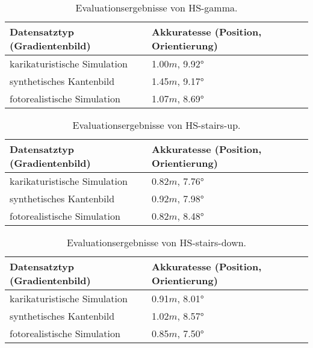 \begin{table}
	\centering
	\caption{Evaluationsergebnisse von HS-gamma.}
	\begin{tabularx}{0.75\textwidth}{X X}\textbf{Datensatztyp} \hspace{2cm} (Gradientenbild)& \textbf{Akkuratesse} \hspace{2cm} (Position, Orientierung)\\
		\hline
		karikaturistische Simulation & 1.00$m$, 9.92°\\
		\hline
		synthetisches Kantenbild & 1.45$m$, 9.17°\\
		\hline
		fotorealistische Simulation & 1.07$m$, 8.69°\\
	\end{tabularx}
	\label{tab:synth_hs_gamma}
\end{table}


\begin{table}
	\centering
	\caption{Evaluationsergebnisse von HS-stairs-up.}
	\begin{tabularx}{0.75\textwidth}{X X}\textbf{Datensatztyp} \hspace{2cm} (Gradientenbild)& \textbf{Akkuratesse} \hspace{2cm} (Position, Orientierung)\\
		\hline
		karikaturistische Simulation & 0.82$m$, 7.76°\\
		\hline
		synthetisches Kantenbild & 0.92$m$, 7.98°\\
		\hline
		fotorealistische Simulation & 0.82$m$, 8.48°\\
	\end{tabularx}
	\label{tab:synth_hs_stairs_up}
\end{table}



\begin{table}
	\centering
	\caption{Evaluationsergebnisse von HS-stairs-down.}
	\begin{tabularx}{0.75\textwidth}{X X}\textbf{Datensatztyp} \hspace{2cm} (Gradientenbild)& \textbf{Akkuratesse} \hspace{2cm} (Position, Orientierung)\\
		\hline
		karikaturistische Simulation & 0.91$m$, 8.01°\\
		\hline
		synthetisches Kantenbild & 1.02$m$, 8.57°\\
		\hline
		fotorealistische Simulation & 0.85$m$, 7.50°\\
	\end{tabularx}
	\label{tab:synth_hs_stairs_down}
\end{table}
